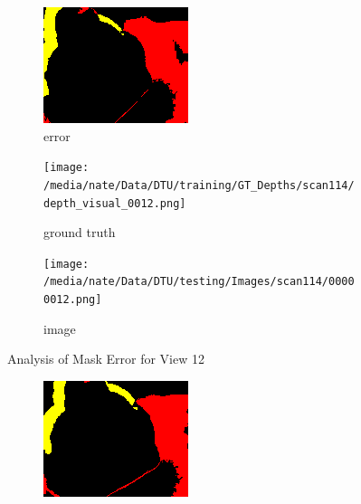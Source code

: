 \documentclass{article}
\begin{document}
\begin{figure}
\begin{subfigure}{0.3\textwidth}
		\includegraphics[width=\textwidth]{./output/012_error.png}
		\caption{error}
		\label{fig:error12}
	\end{subfigure}
	\hfill
	\centering
	\begin{subfigure}{0.3\textwidth}
		\centering
		\texttt{[image: /media/nate/Data/DTU/training/GT\_Depths/scan114/depth\_visual\_0012.png]}
		\caption{ground truth}
		\label{fig:gt12}
	\end{subfigure}
	\hfill
	\centering
	\begin{subfigure}{0.3\textwidth}
		\centering
		\texttt{[image: /media/nate/Data/DTU/testing/Images/scan114/00000012.png]}
		\caption{image}
		\label{fig:img12}
	\end{subfigure}
	\hfill
	\caption{Analysis of Mask Error for View 12}
	\label{fig:error_analys12}
\end{figure}\begin{figure}
	\centering
	\begin{subfigure}{0.3\textwidth}
		\centering
		\includegraphics[width=\textwidth]{./output/013_error.png}

\end{subfigure}
\end{figure}
\end{document}
